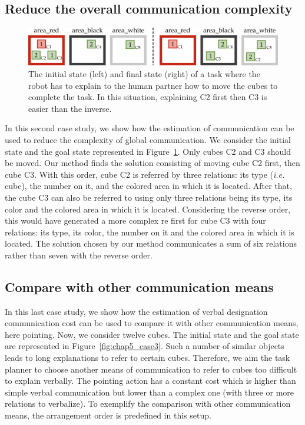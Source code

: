 \subsection{Reduce the overall communication complexity}

\begin{figure}[!ht]
\centering
\includegraphics[width=\textwidth]{figures/chapter5/results_case2.png}
\caption{\label{fig:chap5_case2} The initial state (left) and final state (right) of a task where the robot has to explain to the human partner how to move the cubes to complete the task. In this situation, explaining C2 first then C3 is easier than the inverse. }
\end{figure}

In this second case study, we show how the estimation of communication can be used to reduce the complexity of global communication. We consider the initial state and the goal state represented in Figure~\ref{fig:chap5_case2}. Only cubes C2 and C3 should be moved. Our method finds the solution consisting of moving cube C2 first, then cube C3. With this order, cube C2 is referred by three relations: its type (\textit{i.e.} cube), the number on it, and the colored area in which it is located. After that, the cube C3 can also be referred to using only three relations being its type, its color and the colored area in which it is located. Considering the reverse order, this would have generated a more complex \acrshort{re} first for cube C3 with four relations: its type, its color, the number on it and the colored area in which it is located.
The solution chosen by our method communicates a sum of six relations rather than seven with the reverse order.

\subsection{Compare with other communication means}

In this last case study, we show how the estimation of verbal designation communication cost can be used to compare it with other communication means, here pointing. Now, we consider twelve cubes. The initial state and the goal state are represented in Figure~\ref{fig:chap5_case3}. Such a number of similar objects leads to long explanations to refer to certain cubes. Therefore, we aim the task planner to choose another means of communication to refer to cubes too difficult to explain verbally. The pointing action has a constant cost which is higher than simple verbal communication but lower than a complex one (with three or more relations to verbalize). To exemplify the comparison with other communication means, the arrangement order is predefined in this setup.

